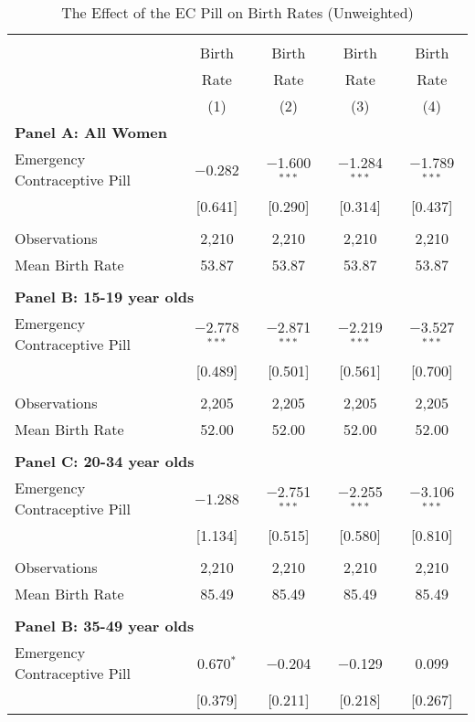 \begin{table}[!htbp] \centering
\caption{The Effect of the EC Pill on Birth Rates (Unweighted)}
\label{TEENtab:aggregateASFRunweight}
\begin{tabular}{@{\extracolsep{5pt}}lcccc}
\\[-1.8ex]\hline \hline \\[-1.8ex] 
& Birth& Birth& Birth& Birth\\
& Rate & Rate & Rate & Rate \\
&(1)&(2)&(3)&(4) \\ \hline
\multicolumn{5}{l}{\noindent \textbf{
Panel A: All Women}} \\
Emergency Contraceptive Pill&$-$0.282&$-$1.600$^{***}$&$-$1.284$^{***}$&$-$1.789$^{***}$\\
            &[0.641]&[0.290]&[0.314]&[0.437]\\
 & & & & \\
Observations&2,210&2,210&2,210&2,210\\
Mean Birth Rate&53.87&53.87&53.87&53.87\\
 & & & & \\
\multicolumn{5}{l}{\noindent \textbf{
Panel B: 15-19 year olds}} \\
Emergency Contraceptive Pill&$-$2.778$^{***}$&$-$2.871$^{***}$&$-$2.219$^{***}$&$-$3.527$^{***}$\\
            &[0.489]&[0.501]&[0.561]&[0.700]\\
 & & & & \\
Observations&2,205&2,205&2,205&2,205\\
Mean Birth Rate   &52.00&52.00&52.00&52.00\\
 & & & & \\
\multicolumn{5}{l}{\noindent \textbf{
Panel C: 20-34 year olds}} \\
Emergency Contraceptive Pill&$-$1.288&$-$2.751$^{***}$&$-$2.255$^{***}$&$-$3.106$^{***}$\\
            &[1.134]&[0.515]&[0.580]&[0.810]\\
 & & & & \\
Observations&2,210&2,210&2,210&2,210\\
Mean Birth Rate   &85.49&85.49&85.49&85.49\\
 & & & & \\
\multicolumn{5}{l}{\noindent \textbf{
Panel B: 35-49 year olds}} \\
Emergency Contraceptive Pill&0.670$^{*}$&$-$0.204&$-$0.129&0.099\\
            &[0.379]&[0.211]&[0.218]&[0.267]\\

\end{tabular}
\end{table}
